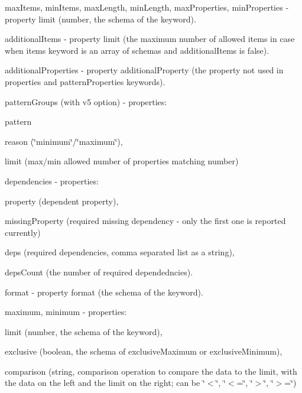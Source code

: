 \begin{DoxyItemize}
\item {\ttfamily max\+Items}, {\ttfamily min\+Items}, {\ttfamily max\+Length}, {\ttfamily min\+Length}, {\ttfamily max\+Properties}, {\ttfamily min\+Properties} -\/ property {\ttfamily limit} (number, the schema of the keyword).
\item {\ttfamily additional\+Items} -\/ property {\ttfamily limit} (the maximum number of allowed items in case when {\ttfamily items} keyword is an array of schemas and {\ttfamily additional\+Items} is false).
\item {\ttfamily additional\+Properties} -\/ property {\ttfamily additional\+Property} (the property not used in {\ttfamily properties} and {\ttfamily pattern\+Properties} keywords).
\item {\ttfamily pattern\+Groups} (with v5 option) -\/ properties\+:
\begin{DoxyItemize}
\item {\ttfamily pattern}
\item {\ttfamily reason} (\char`\"{}minimum\char`\"{}/\char`\"{}maximum\char`\"{}),
\item {\ttfamily limit} (max/min allowed number of properties matching number)
\end{DoxyItemize}
\item {\ttfamily dependencies} -\/ properties\+:
\begin{DoxyItemize}
\item {\ttfamily property} (dependent property),
\item {\ttfamily missing\+Property} (required missing dependency -\/ only the first one is reported currently)
\item {\ttfamily deps} (required dependencies, comma separated list as a string),
\item {\ttfamily deps\+Count} (the number of required dependedncies).
\end{DoxyItemize}
\item {\ttfamily format} -\/ property {\ttfamily format} (the schema of the keyword).
\item {\ttfamily maximum}, {\ttfamily minimum} -\/ properties\+:
\begin{DoxyItemize}
\item {\ttfamily limit} (number, the schema of the keyword),
\item {\ttfamily exclusive} (boolean, the schema of {\ttfamily exclusive\+Maximum} or {\ttfamily exclusive\+Minimum}),
\item {\ttfamily comparison} (string, comparison operation to compare the data to the limit, with the data on the left and the limit on the right; can be \char`\"{}$<$\char`\"{}, \char`\"{}$<$=\char`\"{}, \char`\"{}$>$\char`\"{}, \char`\"{}$>$=\char`\"{})

\end{DoxyItemize}
\end{DoxyItemize}

